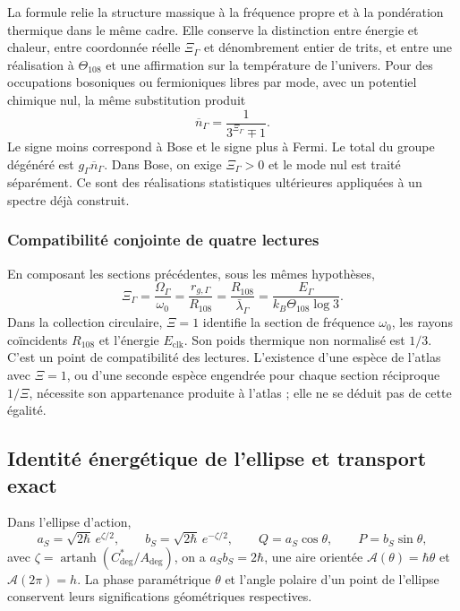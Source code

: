 La formule relie la structure massique à la fréquence propre et à la pondération
thermique dans le même cadre. Elle conserve la distinction entre énergie et chaleur,
entre coordonnée réelle $\Xi_\Gamma$ et dénombrement entier de trits, et entre une
réalisation à $\Theta_{108}$ et une affirmation sur la température de
l’univers. Pour des occupations bosoniques ou fermioniques libres par mode, avec
un potentiel chimique nul, la même substitution produit
\begin{equation}
 \overline n_\Gamma=\frac{1}{3^{\Xi_\Gamma}\mp1}.
 \label{md:hib:ocupaciones}
\end{equation}
Le signe moins correspond à Bose et le signe plus à Fermi. Le total du
groupe dégénéré est $g_\Gamma\overline n_\Gamma$. Dans Bose, on exige
$\Xi_\Gamma>0$ et le mode nul est traité séparément. Ce sont des réalisations
statistiques ultérieures appliquées à un spectre déjà construit.

\subsubsection{Compatibilité conjointe de quatre lectures}
\label{md:hib:cuatro-lecturas}

En composant les sections précédentes, sous les mêmes hypothèses,
\begin{equation}
 \boxed{\Xi_\Gamma=\frac{\Omega_\Gamma}{\omega_0}
 =\frac{r_{g,\Gamma}}{R_{108}}
 =\frac{R_{108}}{\bar\lambda_\Gamma}
 =\frac{E_\Gamma}{k_B\Theta_{108}\log3}.}
 \label{md:hib:compatibilidad-cuatro}
\end{equation}
Dans la collection circulaire, $\Xi=1$ identifie la section de fréquence
$\omega_0$, les rayons coïncidents $R_{108}$ et l’énergie $E_{\mathrm{clk}}$.
Son poids thermique non normalisé est $1/3$. C’est un point de compatibilité des
lectures. L’existence d’une espèce de l’atlas avec $\Xi=1$, ou d’une
seconde espèce engendrée pour chaque section réciproque $1/\Xi$, nécessite
son appartenance produite à l’atlas ; elle ne se déduit pas de cette égalité.

\subsection{Identité énergétique de l’ellipse et transport exact}
\label{md:hib:elipse}

Dans l’ellipse d’action,
\begin{equation}
 a_S=\sqrt{2\hbar}\,e^{\zeta/2},\qquad
 b_S=\sqrt{2\hbar}\,e^{-\zeta/2},\qquad
 Q=a_S\cos\theta,\qquad P=b_S\sin\theta,
 \label{md:hib:elipse-coordenadas}
\end{equation}
avec $\zeta=\operatorname{artanh}(C^*_{\deg}/A_{\deg})$, on a
$a_Sb_S=2\hbar$, une aire orientée
$\mathcal A(\theta)=\hbar\theta$ et $\mathcal A(2\pi)=h$.
La phase paramétrique $\theta$ et l’angle polaire d’un point de l’ellipse
conservent leurs significations géométriques respectives.

